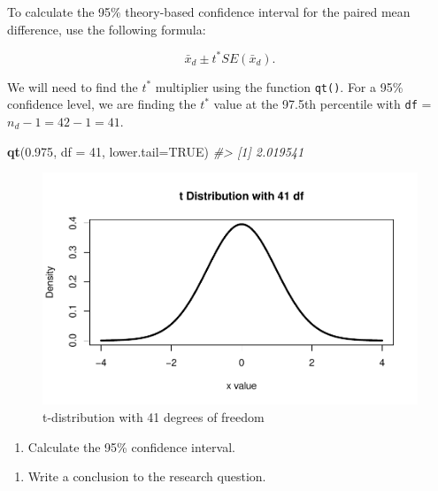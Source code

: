\documentclass[
]{report}
\newenvironment{Shaded}{\begin{snugshade}}{\end{snugshade}}
\newcommand{\AttributeTok}[1]{\textcolor[rgb]{0.13,0.29,0.53}{#1}}
\newcommand{\CommentTok}[1]{\textcolor[rgb]{0.56,0.35,0.01}{\textit{#1}}}
\newcommand{\ConstantTok}[1]{\textcolor[rgb]{0.56,0.35,0.01}{#1}}
\newcommand{\DecValTok}[1]{\textcolor[rgb]{0.00,0.00,0.81}{#1}}
\newcommand{\FloatTok}[1]{\textcolor[rgb]{0.00,0.00,0.81}{#1}}
\newcommand{\FunctionTok}[1]{\textcolor[rgb]{0.13,0.29,0.53}{\textbf{#1}}}
\newcommand{\NormalTok}[1]{#1}
\providecommand{\tightlist}{%
  \setlength{\itemsep}{0pt}\setlength{\parskip}{0pt}}
\begin{document}
To calculate the 95\% theory-based confidence interval for the paired mean difference, use the following formula:

\[\bar{x}_d\pm t^* SE(\bar{x}_d).\]

We will need to find the \(t^*\) multiplier using the function \texttt{qt()}. For a 95\% confidence level, we are finding the \(t^*\) value at the 97.5th percentile with \texttt{df} = \(n_d - 1 = 42 - 1 = 41\).

\newpage

\begin{Shaded}
\begin{Highlighting}[]
\FunctionTok{qt}\NormalTok{(}\FloatTok{0.975}\NormalTok{, }\AttributeTok{df =} \DecValTok{41}\NormalTok{, }\AttributeTok{lower.tail=}\ConstantTok{TRUE}\NormalTok{)}
\CommentTok{\#\textgreater{} [1] 2.019541}
\end{Highlighting}
\end{Shaded}

\begin{figure}

{\centering \includegraphics[width=0.7\linewidth]{14-UR-module11_review_files/figure-latex/tstar-1} 

}

\caption{t-distribution with 41 degrees of freedom}\label{fig:tstar}
\end{figure}

\begin{enumerate}
\def\labelenumi{\arabic{enumi}.}
\setcounter{enumi}{15}
\tightlist
\item
  Calculate the 95\% confidence interval.
\end{enumerate}

\vspace{0.8in}

\begin{enumerate}
\def\labelenumi{\arabic{enumi}.}
\setcounter{enumi}{16}
\tightlist
\item
  Write a conclusion to the research question.
\end{enumerate}
\end{document}
